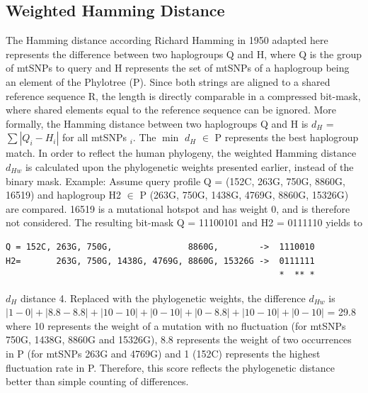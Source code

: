 \subsection{Weighted Hamming Distance}
\label{hamming}
The Hamming distance according Richard Hamming in 1950 adapted here represents the difference between two haplogroups Q and H, where Q is the group of mtSNPs to query and H represents the set of mtSNPs of a haplogroup being an element of the Phylotree (P). Since both strings are aligned to a shared reference sequence R, the length is directly comparable in a compressed bit-mask, where shared elements equal to the reference sequence can be ignored. More formally, the Hamming distance between two haplogroups Q and H is $d_H$ =  $\sum\left|Q_i-H_i\right|$ for all mtSNPs $_i$. The $\min$ $d_H$ $\in$ P represents the best haplogroup match. In order to reflect the human phylogeny, the weighted Hamming distance $d_{Hw}$ is calculated upon the phylogenetic weights presented earlier, instead of the binary mask.
Example: Assume query profile Q = (152C, 263G, 750G, 8860G, 16519) and haplogroup H2 $\in$ P (263G, 750G, 1438G, 4769G, 8860G, 15326G) are compared. 16519 is a mutational hotspot and has weight 0, and is therefore not considered. The resulting bit-mask Q = 11100101 and H2 = 0111110 yields to 
\begin{verbatim}
Q = 152C, 263G, 750G,               8860G,        ->  1110010
H2=       263G, 750G, 1438G, 4769G, 8860G, 15326G ->  0111111
                                                      *  ** *
\end{verbatim}

$d_{H}$ distance 4. Replaced with the phylogenetic weights, the difference $d_{Hw}$ is $|1-0|+|8.8-8.8|+|10-10|+|0-10|+|0-8.8|+|10-10|+|0-10|$ = 29.8 where 10 represents the weight of a mutation with no fluctuation (for mtSNPs 750G, 1438G, 8860G and 15326G), 8.8 represents the weight of two occurrences in P (for mtSNPs 263G and 4769G) and 1 (152C) represents the highest fluctuation rate in P. Therefore, this score reflects the phylogenetic distance better than simple counting of differences.

